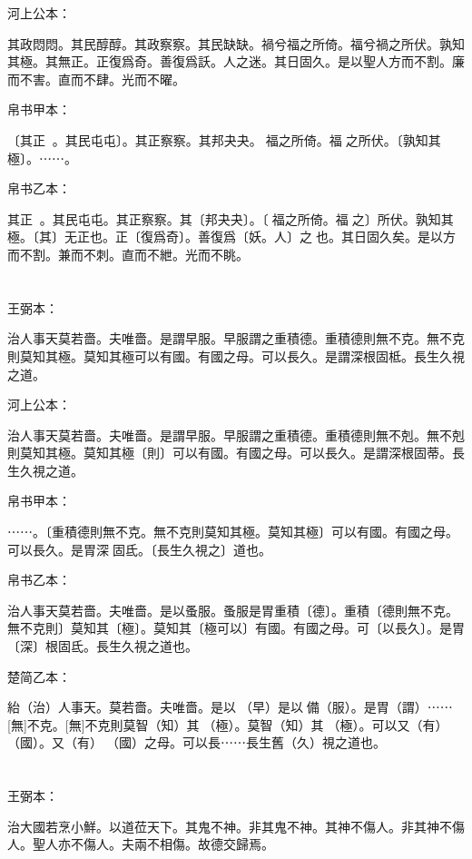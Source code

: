 \documentclass[a5paper]{ctexbook}
\begin{document}
    河上公本：

    其政悶悶。其民醇醇。其政察察。其民缺缺。禍兮福之所倚。福兮禍之所伏。孰知其極。其無正。正復爲奇。善復爲訞。人之迷。其日固久。是以聖人方而不割。廉而不害。直而不肆。光而不曜。

    帛书甲本：

    〔其正󱁅󱁅。其民屯屯〕。其正察察。其邦夬夬。𢢸福之所倚。福𢢸之所伏。〔孰知其極〕。⋯⋯。

    帛书乙本：

    其正󱁅󱁅。其民屯屯。其正察察。其〔邦夬夬〕。〔𢢸福之所倚。福𢢸之〕所伏。孰知其極。〔其〕无正也。正〔復爲奇〕。善復爲〔妖。人〕之𢘻也。其日固久矣。是以方而不割。兼而不刺。直而不紲。光而不眺。

    \chapter{}
    王弼本：

    治人事天莫若嗇。夫唯嗇。是謂早服。早服謂之重積德。重積德則無不克。無不克則莫知其極。莫知其極可以有國。有國之母。可以長久。是謂深根固柢。長生久視之道。

    河上公本：

    治人事天莫若嗇。夫唯嗇。是謂早服。早服謂之重積德。重積德則無不剋。無不剋則莫知其極。莫知其極〔則〕可以有國。有國之母。可以長久。是謂深根固蒂。長生久視之道。

    帛书甲本：

    ⋯⋯。〔重積德則無不克。無不克則莫知其極。莫知其極〕可以有國。有國之母。可以長久。是胃深󱁆固氐。〔長生久視之〕道也。

    帛书乙本：

    治人事天莫若嗇。夫唯嗇。是以蚤服。蚤服是胃重積〔德〕。重積〔德則無不克。無不克則〕莫知其〔極〕。莫知其〔極可以〕有國。有國之母。可〔以長久〕。是胃〔深〕根固氐。長生久視之道也。

    楚简乙本：

    紿（治）人事天。莫若嗇。夫唯嗇。是以󶵙（早）是以󶵙備（服）。是胃（謂）⋯⋯[無]不克。[無]不克則莫智（知）其𠄨（極）。莫智（知）其𠄨（極）。可以又（有）󼷜（國）。又（有）󼷜（國）之母。可以長⋯⋯長生舊（久）視之道也。

    \chapter{}
    王弼本：

    治大國若烹小鮮。以道莅天下。其鬼不神。非其鬼不神。其神不傷人。非其神不傷人。聖人亦不傷人。夫兩不相傷。故德交歸焉。
\end{document}
